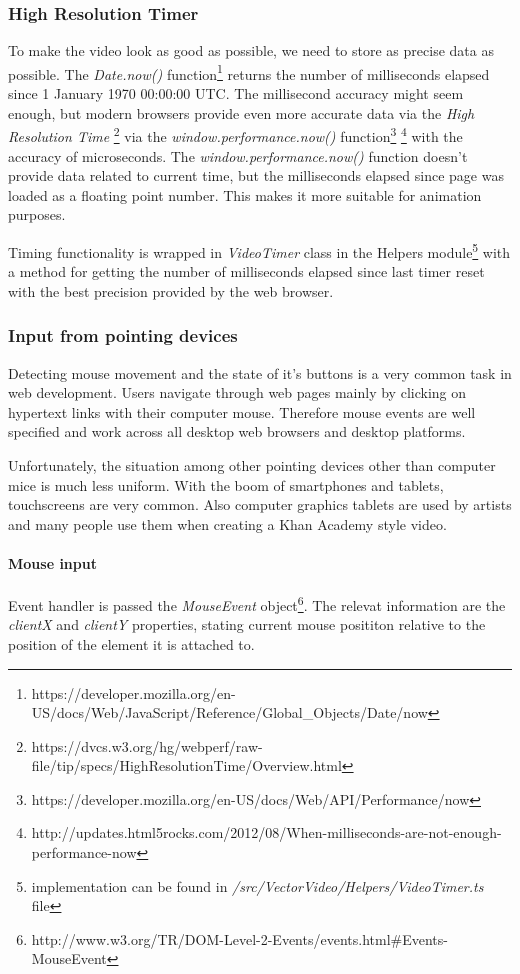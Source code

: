 \subsubsection{High Resolution Timer}
To make the video look as good as possible, we need to store as precise data as possible. The \textit{Date.now()} function\footnote{https://developer.mozilla.org/en-US/docs/Web/JavaScript/Reference/Global\_Objects/Date/now} returns the number of milliseconds elapsed since 1 January 1970 00:00:00 UTC. The millisecond accuracy might seem enough, but modern browsers provide even more accurate data via the \textit{High Resolution Time} \footnote{https://dvcs.w3.org/hg/webperf/raw-file/tip/specs/HighResolutionTime/Overview.html} via the \textit{window.performance.now()} function\footnote{https://developer.mozilla.org/en-US/docs/Web/API/Performance/now} \footnote{http://updates.html5rocks.com/2012/08/When-milliseconds-are-not-enough-performance-now} with the accuracy of microseconds. The \textit{window.performance.now()} function doesn't provide data related to current time, but the milliseconds elapsed since page was loaded as a floating point number. This makes it more suitable for animation purposes.

Timing functionality is wrapped in \textit{VideoTimer} class in the Helpers module\footnote{implementation can be found in \textit{/src/VectorVideo/Helpers/VideoTimer.ts} file} with a method for getting the number of milliseconds elapsed since last timer reset with the best precision provided by the web browser.



\subsubsection{Input from pointing devices}

Detecting mouse movement and the state of it's buttons is a very common task in web development. Users navigate through web pages mainly by clicking on hypertext links with their computer mouse. Therefore mouse events are well specified and work across all desktop web browsers and desktop platforms.

Unfortunately, the situation among other pointing devices other than computer mice is much less uniform. With the boom of smartphones and tablets, touchscreens are very common. Also computer graphics tablets are used by artists and many people use them when creating a Khan Academy style video.

\paragraph{Mouse input}
Event handler is passed the \textit{MouseEvent} object\footnote{http://www.w3.org/TR/DOM-Level-2-Events/events.html\#Events-MouseEvent}. The relevat information are the \textit{clientX} and \textit{clientY} properties, stating current mouse posititon relative to the position of the element it is attached to. 

